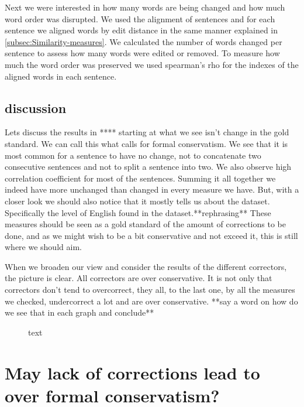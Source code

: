 \documentclass[english]{article}
\begin{document}
Next we were interested in how many words are being changed and how
much word order was disrupted. We used the alignment of sentences
and for each sentence we aligned words by edit distance in the same
manner explained in \ref{subsec:Similarity-measures}. We calculated
the number of words changed per sentence to assess how many words
were edited or removed. To measure how much the word order was preserved
we used spearman's rho for the indexes of the aligned words in each
sentence.

\subsection{discussion}

Lets discuss the results in {*}{*}{*}{*} starting at what we see isn't
change in the gold standard. We can call this what calls for formal
conservatism. We see that it is most common for a sentence to have
no change, not to concatenate two consecutive sentences and not to
split a sentence into two. We also observe high correlation coefficient
for most of the sentences. Summing it all together we indeed have
more unchanged than changed in every measure we have. But, with a
closer look we should also notice that it mostly tells us about the
dataset. Specifically the level of English found in the dataset.{*}{*}rephrasing{*}{*}
These measures should be seen as a gold standard of the amount of
corrections to be done, and as we might wish to be a bit conservative
and not exceed it, this is still where we should aim.

When we broaden our view and consider the results of the different
correctors, the picture is clear. All correctors are over conservative.
It is not only that correctors don't tend to overcorrect, they all,
to the last one, by all the measures we checked, undercorrect a lot
and are over conservative. {*}{*}say a word on how do we see that
in each graph and conclude{*}{*}

\begin{figure}
text
\end{figure}


\section{May lack of corrections lead to over formal conservatism?\label{sec:May-lack-of}}
\end{document}
